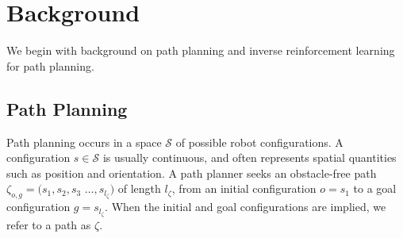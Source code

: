 \documentclass[letterpaper, 10 pt, conference]{ieeeconf}
\begin{document}




\section{Background}
We begin with background on path planning and inverse reinforcement learning for path planning.

\subsection{Path Planning \label{subsec:path_planning}}
Path planning occurs in a space $\mathcal{S}$ of possible robot configurations. A configuration $s \in \mathcal{S}$ is usually continuous, and often represents spatial quantities such as position and orientation. A path planner seeks an obstacle-free path $\zeta_{o,g} = (s_1,s_2,s_3$ $\ldots,s_{l_{\zeta}}) $ of length $l_{\zeta}$, from an initial configuration $o = s_1$ to a goal configuration  $g =s_{l_{\zeta}}$. When the initial and goal configurations are implied, we refer to a path as $\zeta$.
\end{document}
